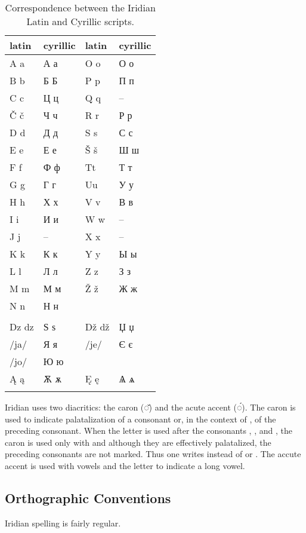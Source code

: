\begin{table}[h]
	\footnotesize\sffamily
 	\caption{Correspondence between the Iridian Latin and Cyrillic scripts.}
	\medskip
	\begin{tabu}to 0.8 
		\toprule
		{{\sc  latin}} & {\sc cyrillic} & {{\sc  latin}} & {\sc cyrillic} \\
		\midrule\addlinespace
		A a 		& А а	& O o   & О о \\ 
		B b			& Б Б 	& P p 	& П п \\
		C c 		& Ц ц 	& Q q 	& -- \\
		Č č 		& Ч ч 	& R r 	& Р р \\
		D d 		& Д д	& S s 	& С с \\
		E e 		& Е е 	& Š š 	& Ш ш \\
		F f			& Ф ф	& Tt 	& Т т \\
		G g 		& Г г	& Uu	& У у \\
		H h			& Х х	& V v   & В в\\
		I i			& И и	& W w   & --\\
		J j			& --	& X x   & --\\
		K k			& К к	& Y y   & Ы ы\\
		L l			& Л л   & Z z   & З з\\
		M m 		& М м   & Ž ž   & Ж ж\\
		N n 		& Н н   &&\\\addlinespace
		\\\addlinespace
		Dz dz 		& Ѕ ѕ 	& Dž dž & Џ џ\\
		/ja/ 		& Я я	&/je/ & Є є\\
		/jo/		& Ю ю   & &\\
		\k{A} \k{a} & Ѫ ѫ&\k{E} \k{e}&Ѧ ѧ\\ \addlinespace
		\bottomrule
	\end{tabu}
\end{table}
 
Iridian uses two diacritics: the caron (◌̌) and the acute accent (◌́). The caron
is used to indicate palatalization of a consonant or, in the context of
, of the preceding consonant. When the letter  is used after the
consonants , ,  and , the caron is used only
with  and although they are effectively palatalized, the preceding
consonants are not marked. Thus one writes  instead of 
or . The accute accent is used with vowels and the letter
 to indicate a long vowel.

\subsection{Orthographic Conventions}
Iridian spelling is fairly regular.

